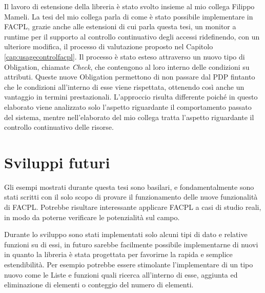 Il lavoro di estensione della libreria è stato svolto insieme al mio collega Filippo Mameli. La tesi del mio collega parla di come è stato possibile implementare in \ac{FACPL}, grazie anche alle estensioni di cui parla questa tesi, un monitor a runtime per il supporto al controllo continuativo degli accessi ridefinendo, con un ulteriore modifica, il processo di valutazione proposto nel Capitolo \ref{cap:usagecontrolfacpl}. Il processo è stato esteso attraverso un nuovo tipo di Obligation, chiamate \textit{Check}, che contengono al loro interno delle condizioni su attributi. Queste nuove Obligation permettono di non passare dal \ac{PDP} fintanto che le condizioni all'interno di esse viene rispettata, ottenendo così anche un vantaggio in termini prestazionali. L'approccio risulta differente poiché in questo elaborato viene analizzato solo l'aspetto riguardante il comportamento passato del sistema, mentre nell'elaborato del mio collega tratta l'aspetto riguardante il controllo continuativo delle risorse.

\section{Sviluppi futuri}
\label{sec:futuro}

Gli esempi mostrati durante questa tesi sono basilari, e fondamentalmente sono stati scritti con il solo scopo di provare il funzionamento delle nuove funzionalità di \ac{FACPL}. Potrebbe risultare interessante applicare \ac{FACPL} a casi di studio reali, in modo da poterne verificare le potenzialità sul campo.\par
Durante lo sviluppo sono stati implementati solo alcuni tipi di dato e relative funzioni su di essi, in futuro sarebbe facilmente possibile implementarne di nuovi in quanto la libreria è stata
progettata per favorirne la rapida e semplice estendibilità. Per esempio potrebbe essere stimolante l'implementare di un tipo nuovo come le Liste e funzioni quali ricerca all'interno di esse, aggiunta ed eliminazione di elementi o conteggio del numero di elementi.